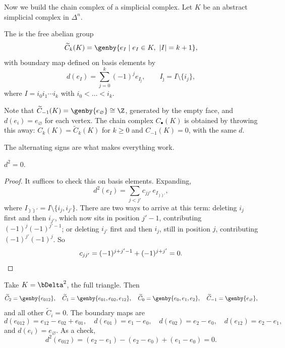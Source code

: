 Now we build the chain complex of a simplicial complex. Let $K$ be an abstract simplicial
complex in $\Delta^n$.

\begin{definition}
	The  is the free abelian group
	$$
	\widetilde C_k(K) = \genby{e_I \mid e_I \in K, \ |I| = k+1},
	$$
	with boundary map defined on basis elements by
	$$
	d(e_I) = \sum_{j=0}^{k}(-1)^j e_{I_{\hat\jmath}}, \qquad I_{\hat\jmath} = I \setminus \{i_j\},
	$$
	where $I = i_0i_1\cdots i_k$ with $i_0 < \dots < i_k$.
\end{definition}

Note that $\widetilde C_{-1}(K) = \genby{e_\varnothing} \cong \Z$, generated by the empty
face, and $d(e_i) = e_\varnothing$ for each vertex. The  chain complex
$C_\bullet(K)$ is obtained by throwing this away: $C_k(K) = \widetilde C_k(K)$ for
$k \geq 0$ and $C_{-1}(K) = 0$, with the same $d$.

The alternating signs are what makes everything work.

\begin{proposition}
	$d^2 = 0$.
\end{proposition}
\begin{proof}
	It suffices to check this on basis elements. Expanding,
	$$
	d^2(e_I) = \sum_{j < j'} c_{jj'}\, e_{I_{\hat\jmath\hat\jmath'}},
	$$
	where $I_{\hat\jmath\hat\jmath'} = I \setminus \{i_j, i_{j'}\}$. There are two ways to arrive at this term: deleting $i_j$ first and then $i_{j'}$, which now sits in position $j'-1$, contributing $(-1)^j(-1)^{j'-1}$; or deleting $i_{j'}$ first and then $i_j$, still in position $j$, contributing $(-1)^{j'}(-1)^j$. So
	$$
	c_{jj'} = (-1)^{j+j'-1} + (-1)^{j+j'} = 0. \qedhere
	$$
\end{proof}

\begin{example} \label{ex:chain-delta2}
	Take $K = \bDelta^2$, the full triangle. Then
	$$
	\widetilde C_2 = \genby{e_{012}},\quad \widetilde C_1 = \genby{e_{01},e_{02},e_{12}},\quad \widetilde C_0 = \genby{e_0,e_1,e_2},\quad \widetilde C_{-1} = \genby{e_\varnothing},
	$$
	and all other $\widetilde C_i = 0$. The boundary maps are
	$$
	d(e_{012}) = e_{12}-e_{02}+e_{01}, \quad d(e_{01}) = e_1-e_0,\quad d(e_{02}) = e_2 - e_0, \quad d(e_{12}) = e_2 - e_1,
	$$
	and $d(e_i) = e_\varnothing$. As a check,
	$$
	d^2(e_{012}) = (e_2-e_1)-(e_2-e_0)+(e_1-e_0) = 0.
	$$
\end{example}

